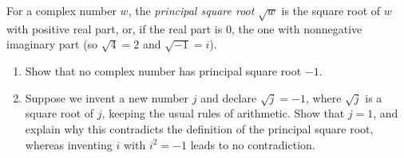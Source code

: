 For a complex number $w$, the \emph{principal square root} $\sqrt w$ is the square root of $w$ with positive real part, or, if the real part is $0$, the one with nonnegative imaginary part (so $\sqrt4=2$ and $\sqrt{-1}=i$).
\begin{enumerate}
\item[(a)] Show that no complex number has principal square root $-1$.
\item[(b)] Suppose we invent a new number $j$ and declare $\sqrt j=-1$, where $\sqrt j$ is a square root of $j$, keeping the usual rules of arithmetic. Show that $j=1$, and explain why this contradicts the definition of the principal square root, whereas inventing $i$ with $i^2=-1$ leads to no contradiction.
\end{enumerate}
